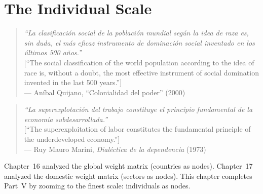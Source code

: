 \documentclass[../structural_economics_book.tex]{subfiles}
\begin{document}
\ifSubfilesClassLoaded{\setcounter{chapter}{17}}{}
\chapter{The Individual Scale}\label{ch:18}
\begin{quote}
\textit{``La clasificaci\'{o}n social de la poblaci\'{o}n mundial seg\'{u}n la idea de raza es, sin duda, el m\'{a}s eficaz instrumento de dominaci\'{o}n social inventado en los \'{u}ltimos 500 a\~{n}os.''}\\[0.3em]
\textnormal{[``The social classification of the world population according to the idea of race is, without a doubt, the most effective instrument of social domination invented in the last 500 years.'']}\\
\hfill --- An\'{i}bal Quijano, ``Colonialidad del poder'' (2000)
\end{quote}
\nocite{quijano2000colonialidad}

\vspace{0.3em}

\begin{quote}
\textit{``La superexplotaci\'{o}n del trabajo constituye el principio fundamental de la econom\'{i}a subdesarrollada.''}\\[0.3em]
\textnormal{[``The superexploitation of labor constitutes the fundamental principle of the underdeveloped economy.'']}\\
\hfill --- Ruy Mauro Marini, \textit{Dial\'{e}ctica de la dependencia} (1973)
\end{quote}
\nocite{marini1973dialectica}

\vspace{1em}

Chapter~16 analyzed the global weight matrix (countries as nodes). Chapter~17 analyzed the domestic weight matrix (sectors as nodes). This chapter completes Part~V by zooming to the finest scale: individuals as nodes.
\end{document}
